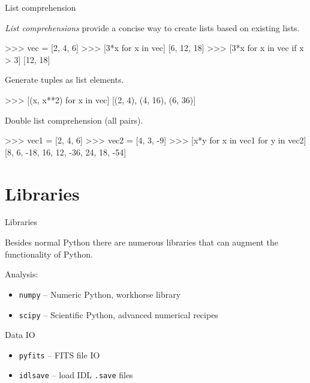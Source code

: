 \documentclass[xetex,10pt]{beamer}
\def\spacer{\vspace*{1em}}
\begin{document}
\begin{frame}[fragile]{List comprehension}

\emph{List comprehensions} provide a concise way to create lists based on existing lists.
	
\begin{python}
>>> vec = [2, 4, 6]
>>> [3*x for x in vec]
[6, 12, 18]
>>> [3*x for x in vec if x > 3]
[12, 18]
\end{python}

\pause
Generate tuples as list elements.

\begin{python}
>>> [(x, x**2) for x in vec]
[(2, 4), (4, 16), (6, 36)]
\end{python}

\pause
Double list comprehension (all pairs).

\begin{python}
>>> vec1 = [2, 4, 6]
>>> vec2 = [4, 3, -9]
>>> [x*y for x in vec1 for y in vec2]
[8, 6, -18, 16, 12, -36, 24, 18, -54]
\end{python}

\end{frame}

\section{Libraries}

\begin{frame}[fragile]{Libraries}

Besides normal Python there are numerous libraries that can augment the functionality of Python.

	\spacer

Analysis:
\begin{itemize}
\item \texttt{numpy} -- Numeric Python, workhorse library
\item \texttt{scipy} -- Scientific Python, advanced numerical recipes
\end{itemize}

	\spacer
	\pause

Data IO
\begin{itemize}
\item \texttt{pyfits} -- FITS file IO
\item \texttt{idlsave} -- load IDL \texttt{.save} files
\end{itemize}

	\spacer
\end{frame}
\end{document}
